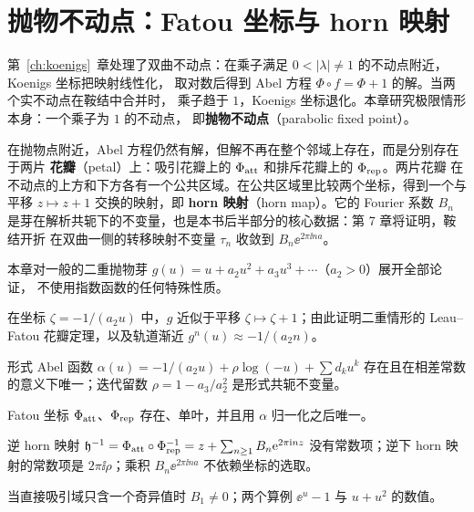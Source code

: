 \providecommand{\Patt}{P_{\mathrm{att}}}
\providecommand{\Prep}{P_{\mathrm{rep}}}
\providecommand{\Oatt}{\Omega_{\mathrm{att}}}
\providecommand{\Orep}{\Omega_{\mathrm{rep}}}
\providecommand{\lrep}{\ell_{\mathrm{rep}}}
\providecommand{\Arg}{\operatorname{Arg}}

\chapter{抛物不动点：Fatou 坐标与 horn 映射}\label{ch:fatou}

第~\ref{ch:koenigs}~章处理了双曲不动点：在乘子满足 $0<|\lambda|\ne1$ 的不动点附近，Koenigs 坐标把映射线性化，
取对数后得到 Abel 方程 $\Phi\circ f=\Phi+1$ 的解。当两个实不动点在鞍结中合并时，
乘子趋于 $1$，Koenigs 坐标退化。本章研究极限情形本身：一个乘子为 $1$ 的不动点，
即\textbf{抛物不动点}（parabolic fixed point）。

在抛物点附近，Abel 方程仍然有解，但解不再在整个邻域上存在，而是分别存在于两片
\textbf{花瓣}（petal）上：吸引花瓣上的 $\Phi_{\mathrm{att}}$ 和排斥花瓣上的 $\Phi_{\mathrm{rep}}$。两片花瓣
在不动点的上方和下方各有一个公共区域。在公共区域里比较两个坐标，得到一个与平移
$z\mapsto z+1$ 交换的映射，即 \textbf{horn 映射}（horn map）。它的 Fourier 系数 $B_n$
是芽在解析共轭下的不变量，也是本书后半部分的核心数据：第 7 章将证明，鞍结开折
在双曲一侧的转移映射不变量 $\tau_n$ 收敛到 $B_n\ee^{2\pi\ii na}$。

本章对一般的二重抛物芽 $g(u)=u+a_2u^2+a_3u^3+\cdots$（$a_2>0$）展开全部论证，
不使用指数函数的任何特殊性质。

\begin{goals}
\item 在坐标 $\zeta=-1/(a_2u)$ 中，$g$ 近似于平移 $\zeta\mapsto\zeta+1$；由此证明二重情形的 Leau--Fatou 花瓣定理，以及轨道渐近 $g^n(u)\approx-1/(a_2n)$。
\item 形式 Abel 函数 $\alpha(u)=-1/(a_2u)+\rho\log(-u)+\sum d_ku^k$ 存在且在相差常数的意义下唯一；迭代留数 $\rho=1-a_3/a_2^2$ 是形式共轭不变量。
\item Fatou 坐标 $\Phi_{\mathrm{att}}$、$\Phi_{\mathrm{rep}}$ 存在、单叶，并且用 $\alpha$ 归一化之后唯一。
\item 逆 horn 映射 $\mathfrak h^{-1}=\Phi_{\mathrm{att}}\circ\Phi_{\mathrm{rep}}^{-1}=z+\sum_{n\ge1}B_n\mathrm{e}^{2\pi\mathrm{i} nz}$ 没有常数项；逆下 horn 映射的常数项是 $2\pi\ii\rho$；乘积 $B_n\ee^{2\pi\ii na}$ 不依赖坐标的选取。
\item 当直接吸引域只含一个奇异值时 $B_1\ne0$；两个算例 $\ee^u-1$ 与 $u+u^2$ 的数值。
\end{goals}

